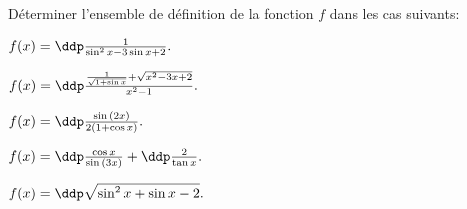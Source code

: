 \begin{exercice} 
D\'eterminer l'ensemble de d\'efinition de la fonction $f$ dans les cas suivants:\vsec\\
\begin{enumerate}
\begin{minipage}[t]{0.45\textwidth}
 \item 
$f(x)=\ddp\frac{1}{\sin^2{x}-3\sin{x}+2}.$  \vsec
\item 
$f(x)=\ddp\frac{\frac{1}{\sqrt{1+\sin{x}}}  +\sqrt{x^2-3x+2}  }{x^2-1}.$
\end{minipage}
\begin{minipage}[t]{0.45\textwidth}
 \item   
$f(x)=\ddp\frac{\sin{(2x)}}{2(1+\cos{x})}.$\vsec
\item 
$f(x)=\ddp\frac{\cos{x}}{\sin{(3x)}}+\ddp\frac{2}{\tan{x}}.$\vsec
\item 
$f(x)=\ddp\sqrt{\sin^2{x}+\sin{x}-2}.$    
\end{minipage}
\end{enumerate}
\end{exercice}